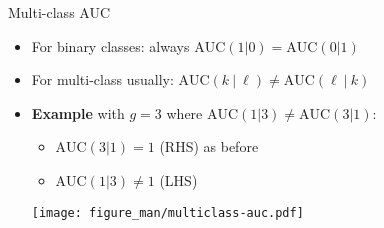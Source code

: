 \documentclass[11pt,compress,t,notes=noshow, xcolor=table]{beamer}
\begin{document}
\begin{vbframe}{Multi-class AUC}

\begin{itemize}
\item For binary classes: always $\text{AUC}(1 | 0) = \text{AUC}(0 | 1)$

\item For multi-class usually:
$\text{AUC}(k ~|~ \ell) \neq \text{AUC}(\ell ~|~ k)$

\item
\textbf{Example} with $g=3$ where $\text{AUC}(1|3) \neq \text{AUC}(3|1) $:
\begin{itemize}
\item $\text{AUC}(3|1) = 1$ (RHS) as before 
\item $\text{AUC}(1|3) \neq 1$ (LHS) 
\end{itemize}

\centerline{\texttt{[image: figure\_man/multiclass-auc.pdf]}}

\end{itemize}


\end{vbframe}

\end{document}
